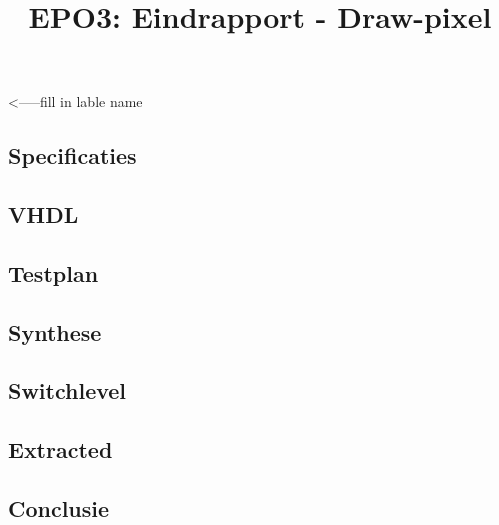\documentclass{scrartcl} %
\author{}%
\title{EPO3: Eindrapport - Draw-pixel}
\begin{document}
\section{} %
\label{sec:}  <-----fill in lable name


\subsection{Specificaties}


\subsection{VHDL}


\subsection{Testplan}


\subsection{Synthese}


\subsection{Switchlevel}


\subsection{Extracted}

\subsection{Conclusie}
\end{document}
